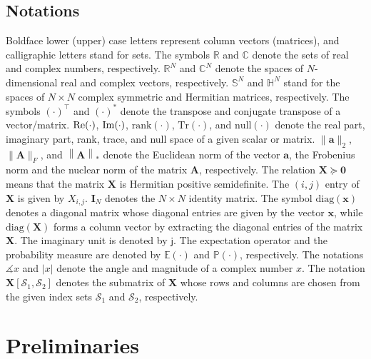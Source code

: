\documentclass[journal,twoside]{IEEEtran}
\newcommand{\rank}{{\mathrm {rank}}}
\newcommand{\diag}{{\mathrm {diag}}}
\newcommand{\re}{{\rm Re}}
\newcommand{\im}{{\rm Im}}
\newcommand{\Tr}{\mathrm{Tr}}
\newcommand{\mi}{\mathsf{j}}
\newcommand{\nuclearnorm}[1]{\left\lVert#1\right\rVert_*}
\newcommand{\bx}{\mathbf{x}}
\newcommand{\bA}{\mathbf{A}}
\newcommand{\bX}{\mathbf{X}}
\begin{document}
\subsection{Notations}

Boldface lower (upper) case letters represent column vectors (matrices), and calligraphic letters stand for sets.
The symbols $\mathbb{R}$ and $\mathbb{C}$ denote the sets of real and complex numbers, respectively.
$\mathbb{R}^{N}$ and $\mathbb{C}^{N}$ denote the spaces of $N$-dimensional real and complex vectors, respectively.
$\mathbb{S}^N$ and $\mathbb{H}^N$ stand for the spaces of $N\times N$ complex symmetric and Hermitian matrices, respectively.
The symbols $(\cdot)^{\top}$ and $(\cdot)^{*}$ denote the transpose and conjugate transpose of a vector/matrix.
$\re(\cdot)$, $\im(\cdot)$, $\rank(\cdot)$,  $\Tr(\cdot)$,  and $\mathrm{null}(\cdot)$  denote the real part,
imaginary part, rank, trace, and null space of a given scalar or matrix.
$\|\mathbf{a}\|_2$, $\|\bA\|_F$, and $\nuclearnorm{\bA}$ denote the Euclidean norm of the vector $\mathbf{a}$,
the Frobenius norm and the nuclear norm of the matrix $\bA$, respectively.
The relation $\bX \succeq \mathbf{0}$ means that the matrix $\bX$ is Hermitian positive semidefinite.
The $(i,j)$ entry of $\bX$ is given by $X_{i,j}$. $\mathbf{I}_{N}$ denotes the $N\times N$ identity matrix.
The symbol $\diag(\bx)$ denotes a diagonal matrix whose diagonal entries are given by the vector $\bx$, while
$\diag(\bX)$ forms a column vector by extracting the diagonal entries of the matrix $\bX$.
The imaginary unit is denoted by $\mi$.
The expectation operator and the probability measure are denoted by $\mathbb{E(\cdot)}$ and $\mathbb{P}(\cdot)$, respectively.
The notations $\measuredangle x$ and $\lvert x\rvert$ denote the angle and  magnitude of a complex number $x$.
The notation $\bX[\mathcal{S}_1,\mathcal{S}_2]$ denotes the submatrix of $\bX$ whose rows and columns are
chosen from the  given index sets $\mathcal{S}_1$ and $\mathcal{S}_2$, respectively.



\section{Preliminaries}
\end{document}
